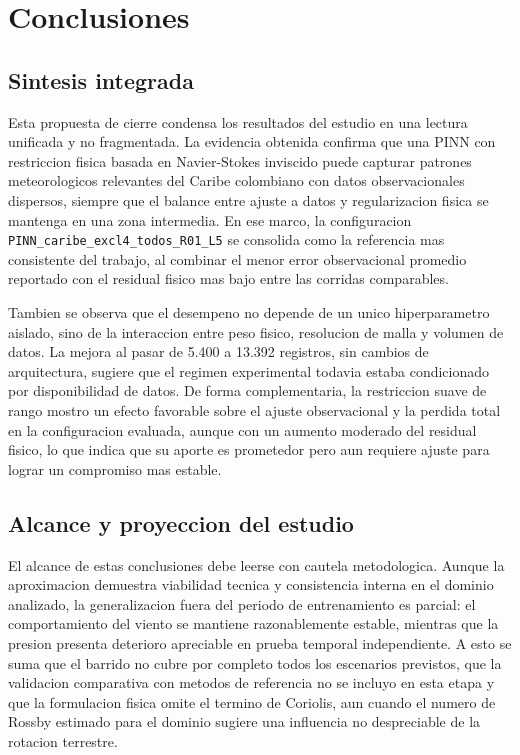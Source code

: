 \chapter{Conclusiones}

\section{Sintesis integrada}

Esta propuesta de cierre condensa los resultados del estudio en una lectura unificada y no fragmentada. La evidencia obtenida confirma que una PINN con restriccion fisica basada en Navier-Stokes inviscido puede capturar patrones meteorologicos relevantes del Caribe colombiano con datos observacionales dispersos, siempre que el balance entre ajuste a datos y regularizacion fisica se mantenga en una zona intermedia. En ese marco, la configuracion \nolinkurl{PINN_caribe_excl4_todos_R01_L5} se consolida como la referencia mas consistente del trabajo, al combinar el menor error observacional promedio reportado con el residual fisico mas bajo entre las corridas comparables.

Tambien se observa que el desempeno no depende de un unico hiperparametro aislado, sino de la interaccion entre peso fisico, resolucion de malla y volumen de datos. La mejora al pasar de 5.400 a 13.392 registros, sin cambios de arquitectura, sugiere que el regimen experimental todavia estaba condicionado por disponibilidad de datos. De forma complementaria, la restriccion suave de rango mostro un efecto favorable sobre el ajuste observacional y la perdida total en la configuracion evaluada, aunque con un aumento moderado del residual fisico, lo que indica que su aporte es prometedor pero aun requiere ajuste para lograr un compromiso mas estable.

\section{Alcance y proyeccion del estudio}

El alcance de estas conclusiones debe leerse con cautela metodologica. Aunque la aproximacion demuestra viabilidad tecnica y consistencia interna en el dominio analizado, la generalizacion fuera del periodo de entrenamiento es parcial: el comportamiento del viento se mantiene razonablemente estable, mientras que la presion presenta deterioro apreciable en prueba temporal independiente. A esto se suma que el barrido no cubre por completo todos los escenarios previstos, que la validacion comparativa con metodos de referencia no se incluyo en esta etapa y que la formulacion fisica omite el termino de Coriolis, aun cuando el numero de Rossby estimado para el dominio sugiere una influencia no despreciable de la rotacion terrestre.

